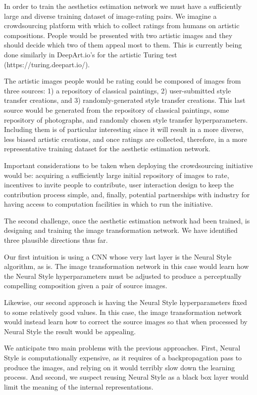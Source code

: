 In order to train the aesthetics estimation network we must have a sufficiently large and diverse training dataset of image-rating pairs.
We imagine a crowdsourcing platform with which to collect ratings from humans on artistic compositions.
People would be presented with two artistic images and they should decide which two of them appeal most to them.
This is currently being done similarly in DeepArt.io's for the artistic Turing test (https://turing.deepart.io/).

The artistic images people would be rating could be composed of images from three sources: 1) a repository of classical paintings, 2) user-submitted style transfer creations, and 3) randomly-generated style transfer creations.
This last source would be generated from the repository of classical paintings, some repository of photographs, and randomly chosen style transfer hyperparameters.
Including them is of particular interesting since it will result in a more diverse, less biased artistic creations, and once ratings are collected, therefore, in a more representative training dataset for the aesthetic estimation network.

Important considerations to be taken when deploying the crowdsourcing initiative would be: acquiring a sufficiently large initial repository of images to rate, incentives to invite people to contribute, user interaction design to keep the contribution process simple, and, finally, potential partnerships with industry for having access to computation facilities in which to run the initiative.

The second challenge, once the aesthetic estimation network had been trained, is designing and training the image transformation network.
We have identified three plausible directions thus far.

Our first intuition is using a CNN whose very last layer is the Neural Style algorithm, as is.
The image transformation network in this case would learn how the Neural Style hyperparameters must be adjusted to produce a perceptually compelling composition given a pair of source images.

Likewise, our second approach is having the Neural Style hyperparameters fixed to some relatively good values.
In this case, the image transformation network would instead learn how to correct the source images so that when processed by Neural Style the result would be appealing.

We anticipate two main problems with the previous approaches.
First, Neural Style is computationally expensive, as it requires of a backpropagation pass to produce the images, and relying on it would terribly slow down the learning process.
And second, we suspect reusing Neural Style as a black box layer would limit the meaning of the internal representations.

